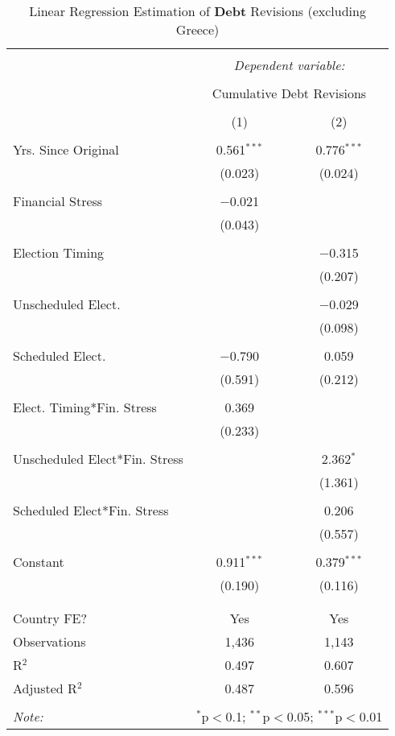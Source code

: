 
\begin{table}[!htbp] \centering 
  \caption{Linear Regression Estimation of \textbf{Debt} Revisions (excluding Greece)} 
  \label{debt_no_greece_results} 
\small 
\begin{tabular}{@{\extracolsep{5pt}}lcc} 
\\[-1.8ex]\hline 
\hline \\[-1.8ex] 
 & \multicolumn{2}{c}{\textit{Dependent variable:}} \\ 
\cline{2-3} 
\\[-1.8ex] & \multicolumn{2}{c}{Cumulative Debt Revisions} \\ 
\\[-1.8ex] & (1) & (2)\\ 
\hline \\[-1.8ex] 
 Yrs. Since Original & 0.561$^{***}$ & 0.776$^{***}$ \\ 
  & (0.023) & (0.024) \\ 
  & & \\ 
 Financial Stress & $-$0.021 &  \\ 
  & (0.043) &  \\ 
  & & \\ 
 Election Timing &  & $-$0.315 \\ 
  &  & (0.207) \\ 
  & & \\ 
 Unscheduled Elect. &  & $-$0.029 \\ 
  &  & (0.098) \\ 
  & & \\ 
 Scheduled Elect. & $-$0.790 & 0.059 \\ 
  & (0.591) & (0.212) \\ 
  & & \\ 
 Elect. Timing*Fin. Stress & 0.369 &  \\ 
  & (0.233) &  \\ 
  & & \\ 
 Unscheduled Elect*Fin. Stress &  & 2.362$^{*}$ \\ 
  &  & (1.361) \\ 
  & & \\ 
 Scheduled Elect*Fin. Stress &  & 0.206 \\ 
  &  & (0.557) \\ 
  & & \\ 
 Constant & 0.911$^{***}$ & 0.379$^{***}$ \\ 
  & (0.190) & (0.116) \\ 
  & & \\ 
\hline \\[-1.8ex] 
Country FE? & Yes & Yes \\ 
Observations & 1,436 & 1,143 \\ 
R$^{2}$ & 0.497 & 0.607 \\ 
Adjusted R$^{2}$ & 0.487 & 0.596 \\ 
\hline 
\hline \\[-1.8ex] 
\textit{Note:}  & \multicolumn{2}{r}{$^{*}$p$<$0.1; $^{**}$p$<$0.05; $^{***}$p$<$0.01} \\ 
\end{tabular} 
\end{table} 
